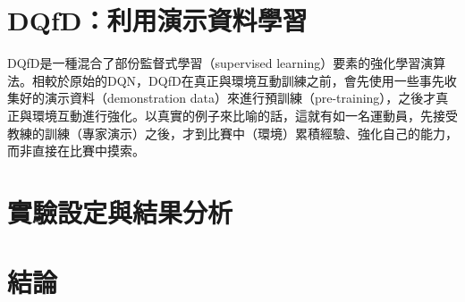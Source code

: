 \documentclass{article}
\begin{document}
\section{DQfD：利用演示資料學習}
DQfD是一種混合了部份監督式學習（supervised learning）要素的強化學習演算法。相較於原始的DQN，DQfD在真正與環境互動訓練之前，會先使用一些事先收集好的演示資料（demonstration data）來進行預訓練（pre-training），之後才真正與環境互動進行強化。以真實的例子來比喻的話，這就有如一名運動員，先接受教練的訓練（專家演示）之後，才到比賽中（環境）累積經驗、強化自己的能力，而非直接在比賽中摸索。


\section{實驗設定與結果分析}

\section{結論}



\renewcommand\refname{參考文獻}


\end{document}
